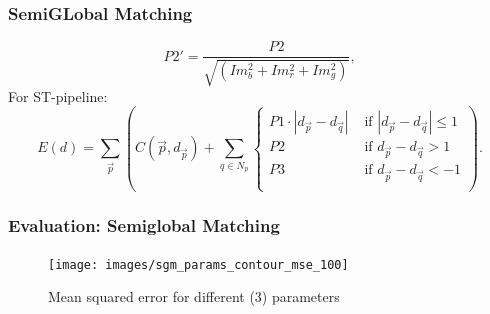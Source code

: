 \documentclass[11pt]{beamer}
\begin{document}
\begin{frame}
\frametitle{SemiGLobal Matching}
\begin{equation}\label{key}
P2' =  \frac{P2}{\sqrt{(Im_b^2 +Im_r^2 + Im_g^2)}},
\end{equation}
For ST-pipeline:
\begin{equation}\label{eq:global_sgm_cont_occlusion}
E(d) = \sum_{\vec p} \left(C(\vec{p}, d_{\vec p}) + \sum_{q\in N_p} 
\begin{cases}
P1\cdot |d_{\vec p} - d_{\vec q}|  & \text{ if }|d_{\vec p} - d_{\vec q}| \leq 1\\
P2 & \text{ if }d_{\vec p} - d_{\vec q} > 1\\
P3 & \text{ if }d_{\vec p} - d_{\vec q} < -1\\
\end{cases}  
\right).
\end{equation}
\end{frame}







\begin{frame}
\frametitle{Evaluation: Semiglobal Matching}
\begin{figure}
	\centering
	\texttt{[image: images/sgm\_params\_contour\_mse\_100]}
	\caption[mse_100]{Mean squared error for different (3) parameters}
	\label{fig:sgmparamscontourmse100}
\end{figure}
\end{frame}
\end{document}
